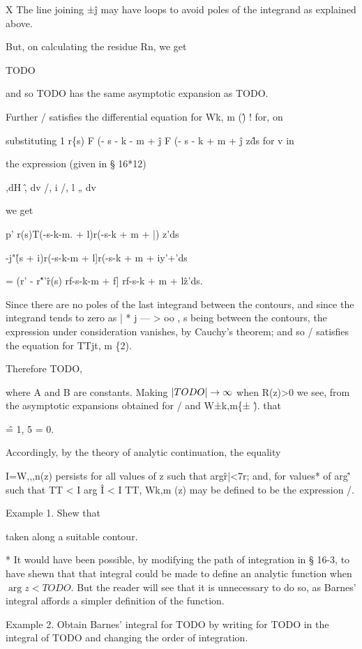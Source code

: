 X The line joining ±\^j may have loops to avoid poles of the integrand
as explained above.

%
%
But, on calculating the residue Rn, we get

TODO

and so TODO has the same asymptotic expansion as TODO.

Further / satisfies the differential equation for Wk, m (\^) ! for, on

substituting 1 r\{s) F (- s - k - m + \^j F (- s - k + m + \^j z\^ds
for v in

the expression (given in § 16*12)

,dH \^, dv /, i /, l „ dv

we get

p' r(s)T(-s-k-m. + l)r(-s-k + m + |) z'ds

-j"\r(s + i)r(-s-k-m + l]r(-s-k + m + iy'+'ds

= (r' - r\^"'\^ r(s) rf-s-k-m + f] rf-s-k + m + l\^z'ds.

Since there are no poles of the last integrand between the contours,
and since the integrand tends to zero as | * j — > oo , s being
between the contours, the expression under consideration vanishes, by
Cauchy's theorem; and so / satisfies the equation for TTjt, m \{2).

Therefore TODO,

where A and B are constants. Making $\left| TODO \right| \rightarrow \infty$
when R(z)>0 we see, from the asymptotic expansions obtained for / and
W±k,m\{± \^). that

\^ = 1, 5 = 0.

Accordingly, by the theory of analytic continuation, the equality

I=W,,,n(z) persists for all values of z such that arg\^r|<7r; and, for
values* of arg\^' such that TT < I arg \^ I < I TT, Wk,m (z) may be
defined to be the expression /.

Example 1. Shew that

taken along a suitable contour.

* It would have been possible, by modifying the path of integration in
§ 16-3, to have shewn that that integral could be made to define an
analytic function when $\arg z < TODO$. But the reader will see that
it is unnecessary to do so, as Barnes' integral affords a simpler
definition of the function.

%
%

Example 2. Obtain Barnes' integral for TODO by writing for TODO in the
integral of TODO and changing the order of integration.

